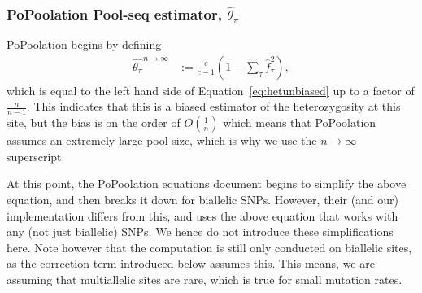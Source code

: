 \documentclass[a4paper,fontsize=9pt,DIV=14]{scrartcl}
\newcounter{todo}
\newcommand\todo[1]{}
\newcommand{\samplesize}{n}
\newcommand{\coverage}{c}
\newcommand{\empfreq}{\widehat{f}}
\newcommand{\thetapi}{\widehat{\theta_\pi}}
\begin{document}
\subsubsection*{PoPoolation Pool-seq estimator, $\thetapi$}
\label{supp:sec:ThetaPi:sub:PoolSequencing}

%

PoPoolation begins by defining %
\begin{align}
    \label{eq:ThetaPiFreq2}
    \thetapi^{\samplesize\to\infty} &:= \frac{\coverage}{\coverage-1} \left(1 - \sum_\tau \empfreq_\tau^2 \right),
\end{align}
%
which is equal to the left hand side of Equation~\ref{eq:hetunbiased} up to a factor of $\frac{\samplesize}{\samplesize-1}$.  This indicates that this is a biased estimator of the heterozygosity at this site, but the bias is on the order of $O\left(\frac{1}{\samplesize}\right)$ which means that PoPoolation assumes an extremely large pool size, which is why we use the $\samplesize\to\infty$ superscript.

At this point, the PoPoolation equations document begins to simplify the above equation, and then breaks it down for biallelic SNPs. However, their (and our) implementation differs from this, and uses the above equation that works with any (not just biallelic) SNPs. We hence do not introduce these simplifications here.
Note however that the computation is still only conducted on biallelic sites, as the correction term introduced below assumes this. This means, we are assuming that multiallelic sites are rare, which is true for small mutation rates.
\end{document}
